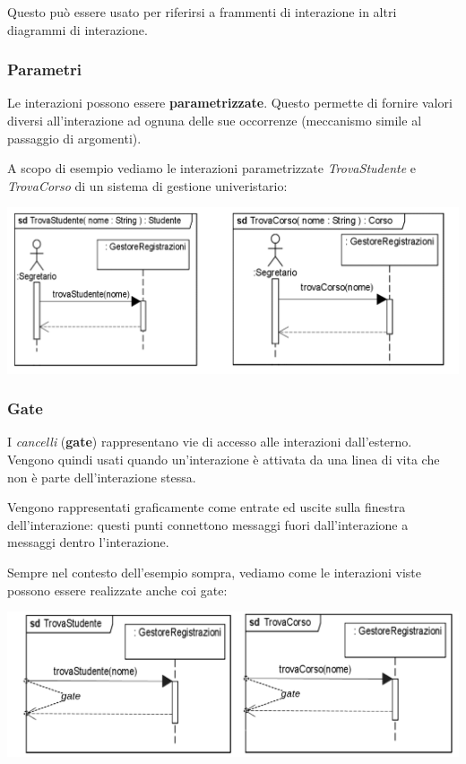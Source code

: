 \documentclass[a4paper,11pt]{article}
\begin{document}
Questo può essere usato per riferirsi a frammenti di interazione in altri diagrammi di interazione.

\subsubsection{Parametri}
Le interazioni possono essere \textbf{parametrizzate}.
Questo permette di fornire valori diversi all'interazione ad ognuna delle sue occorrenze (meccanismo simile al passaggio di argomenti).

A scopo di esempio vediamo le interazioni parametrizzate \textit{TrovaStudente} e \textit{TrovaCorso} di un sistema di gestione univeristario:
\begin{center}
	\includegraphics[scale=0.3]{../figures/frammenti_param.png}
\end{center}

\subsubsection{Gate}
I \textit{cancelli} (\textbf{gate}) rappresentano vie di accesso alle interazioni dall'esterno. Vengono quindi usati quando un’interazione è attivata da una linea di vita che non è parte dell’interazione stessa.

Vengono rappresentati graficamente come entrate ed uscite sulla finestra dell'interazione: questi punti connettono messaggi fuori dall'interazione a messaggi dentro l'interazione.

Sempre nel contesto dell'esempio sompra, vediamo come le interazioni viste possono essere realizzate anche coi gate:
\begin{center}
	\includegraphics[scale=0.3]{../figures/frammenti_gate.png}
\end{center}
\end{document}
